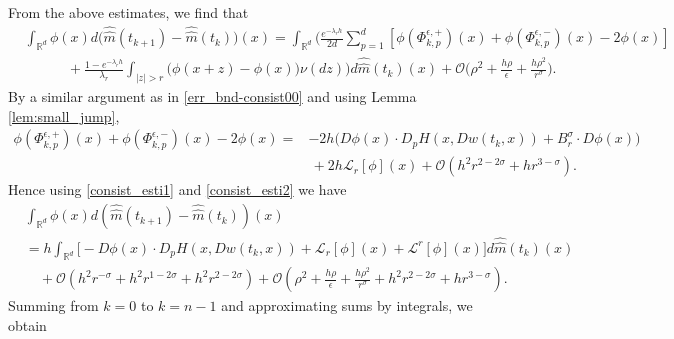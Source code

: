 \documentclass[a4paper,  twoside, 10pt, leqno]{amsart}
\newcommand{\rd}{\mathbb{R}^d}
\theoremstyle{remark}
\theoremstyle{definition}
\begin{document}
From the above estimates, we find that
\begin{align*}
&\int_{\rd} \phi(x) d\big(\widehat{\widehat{m}}(t_{k+1}) - \widehat{\widehat{m}}(t_k)\big)(x) 
 =  \int_{\rd} \Big( \frac{e^{-\lambda_r h}}{2d}\sum_{p=1}^d [\phi(\Phi_{k,p}^{\epsilon,+})(x)+ \phi(\Phi_{k,p}^{\epsilon,-})(x)- 2\phi(x)]  \\
 & \qquad \quad   + \frac{1-e^{-\lambda_r h}}{\lambda_r} \int_{|z|>r} \big(\phi(x+z) - \phi(x)\big) \nu(dz) \Big) d\widehat{\widehat{m}}(t_k)(x) +  \mathcal{O} \big(\rho^2 + \frac{h\rho}{\epsilon} +\frac{h\rho^2}{r^{\sigma}}\big).
\end{align*}
By a similar argument as in \eqref{err_bnd-consist00} and using Lemma \ref{lem:small_jump},
\begin{align*}
\phi(\Phi_{k,p}^{\epsilon,+})(x)+ \phi(\Phi_{k,p}^{\epsilon,-})(x)- 2\phi(x) = & - 2h \Big(D\phi(x)\cdot D_p H(x, Dw(t_k,x)) + B_r^{\sigma}\cdot D\phi(x)\Big)\\
& \, + 2h \mathcal{L}_r[\phi](x) + \mathcal{O}(h^2r^{2-2\sigma} + hr^{3-\sigma} ).
\end{align*}
Hence using \eqref{consist_esti1} and \eqref{consist_esti2} we have 
\begin{align*}
&\int_{\rd} \phi(x)d(\widehat{\widehat{m}}(t_{k+1}) -\widehat{\widehat{m}}(t_k))(x)  \\
& = h\int_{\rd} \big[- D\phi(x)\cdot D_p H(x, Dw(t_k,x)) + \mathcal{L}_r[\phi](x)+\mathcal{L}^r[\phi](x)\big] d\widehat{\widehat{m}}(t_k)(x) \\
  & \quad+\mathcal{O}(h^2 r^{-\sigma} + h^2 r^{1-2\sigma} + h^2 r^{2-2\sigma} ) +  \mathcal{O} (\rho^2 + \frac{h\rho}{\epsilon} +\frac{h\rho^2}{r^{\sigma}} +h^2r^{2-2\sigma} + hr^{3-\sigma}).
\end{align*}
Summing from $k=0$ to $k=n-1$ and approximating sums by integrals, we obtain
\end{document}
